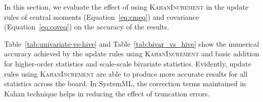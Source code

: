 In this section, we evaluate the effect of using \textsc{KahanIncrement} in the update rules of central moments (Equation~\ref{eq:cmeq}) and covariance (Equation~\ref{eq:coveq}) on the accuracy of the results.

Table~\ref{tab:univariate-vs-hive} and Table~\ref{tab:bivar_vs_hive} show the numerical accuracy achieved by the update rules using \textsc{KahanIncrement} and basic addition for higher-order statistics and scale-scale bivariate statistics. Evidently, update rules using \textsc{KahanIncrement} are able to produce more accurate results for all statistics across the board. In SystemML, the correction terms maintained in Kahan technique helps in reducing the effect of truncation errors. 

%


